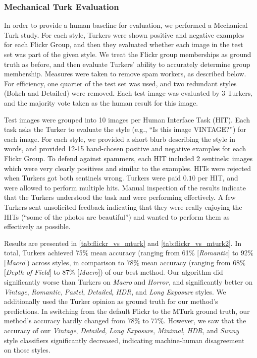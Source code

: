 \subsubsection{Mechanical Turk Evaluation}\label{sec:mech_turk_evaluation}

In order to provide a human baseline for evaluation, we performed a Mechanical Turk study.
For each style, Turkers were shown positive and negative examples for each Flickr Group, and then they evaluated whether each image in the test set was part of the given style.
We treat the Flickr group memberships as ground truth as before, and then evaluate Turkers' ability to accurately determine group membership.
Measures were taken to remove spam workers, as described below.
For efficiency, one quarter of the test set was used, and two redundant styles (Bokeh and Detailed) were removed.
Each test image was evaluated by 3 Turkers, and the majority vote taken as the human result for this image.

Test images were grouped into 10 images per Human Interface Task (HIT). Each task asks the Turker to evaluate the style (e.g., ``Is this image VINTAGE?'') for each image.  For each style, we provided a short blurb describing the style in words, and provided 12-15 hand-chosen positive and negative examples for each Flickr Group.
To defend against spammers, each HIT included 2 sentinels: images which were very clearly positives and similar to the examples.  HITs were rejected when Turkers got both sentinels wrong.
Turkers were paid $0.10$ per HIT, and were allowed to perform multiple hits.  Manual inspection of the results indicate that the Turkers understood the task and were performing effectively.  A few Turkers sent unsolicited feedback indicating that they were really enjoying the HITs (``some of the photos are beautiful'') and wanted to perform them as effectively as possible.

Results are presented in \autoref{tab:flickr_vs_mturk} and \autoref{tab:flickr_vs_mturk2}.
In total, Turkers achieved 75\% mean accuracy (ranging from 61\% [\emph{Romantic}] to 92\% [\emph{Macro}]) across styles, in comparison to 78\% mean accuracy (ranging from 68\% [\emph{Depth of Field}] to 87\% [\emph{Macro}]) of our best method.
Our algorithm did significantly worse than Turkers on \emph{Macro} and \emph{Horror}, and significantly better on \emph{Vintage}, \emph{Romantic}, \emph{Pastel}, \emph{Detailed}, \emph{HDR}, and \emph{Long Exposure} styles.
We additionally used the Turker opinion as ground truth for our method's predictions.
In switching from the default Flickr to the MTurk ground truth, our method's accuracy hardly changed from 78\% to 77\%.
However, we saw that the accuracy of our \emph{Vintage}, \emph{Detailed}, \emph{Long Exposure}, \emph{Minimal}, \emph{HDR}, and \emph{Sunny} style classifiers significantly decreased, indicating machine-human disagreement on those styles.


